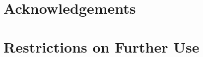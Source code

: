\documentclass{acm_proc_article-sp}
\begin{document}
\section{Acknowledgements}

\section{Restrictions on Further Use}



\end{document}
